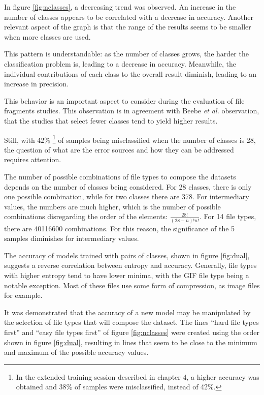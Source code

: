 
In figure \ref{fig:nclasses}, a decreasing trend was observed. An increase in the number of classes appears to be correlated with a decrease in accuracy. Another relevant aspect of the graph is that the range of the results seems to be smaller when more classes are used.  

This pattern is understandable: as the number of classes grows, the harder the classification problem is, leading to a decrease in accuracy. Meanwhile, the individual contributions of each class to the overall result diminish, leading to an increase in precision.

This behavior is an important aspect to consider during the evaluation of file fragments studies. This observation is in agreement with Beebe \textit{et al.} \cite{beebe_sceadan:_2013} observation, that the studies that select fewer classes tend to yield higher results. 

Still, with 42\% \footnote{In the extended training session described in chapter 4, a higher accuracy was obtained and 38\% of samples were misclassified, instead of 42\%.} of samples being misclassified when the number of classes is 28, the question of what are the error sources and how they can be addressed requires attention.

The number of possible combinations of file types to compose the datasets depends on the number of classes being considered. For 28 classes, there is only one possible combination, while for two classes there are 378. For intermediary values, the numbers are much higher, which is the number of possible combinations disregarding the order of the elements: $ \frac{28!}{(28-n)!n!}$. For 14 file types, there are 40116600 combinations. For this reason, the significance of the 5 samples diminishes for intermediary values.


The accuracy of models trained with pairs of classes, shown in figure \ref{fig:dual}, suggests a reverse correlation between entropy and accuracy. Generally, file types with higher entropy tend to have lower minima, with the GIF file type being a notable exception. Most of these files use some form of compression, as image files for example.

It was demonstrated that the accuracy of a new model may be manipulated by the selection of file types that will compose the dataset. The lines ``hard file types first'' and ``easy file types first'' of figure \ref{fig:nclasses} were created using the order shown in figure \ref{fig:dual}, resulting in lines that seem to be close to the minimum and maximum of the possible accuracy values. 

